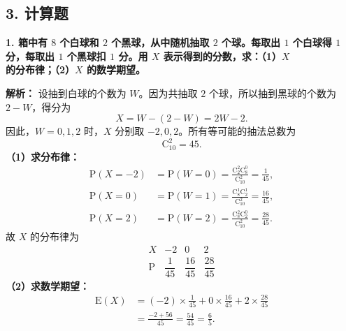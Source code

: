 ﻿\documentclass[UTF8,11pt,a4paper]{ctexart}
\newcommand{\Pp}{\mathrm{P}}
\newcommand{\E}{\mathrm{E}}
\newcommand{\Cnk}[2]{\mathrm{C}_{#1}^{#2}}
\newcommand{\Ana}[1]{\par\textbf{解析：}#1\par\medskip}
\newcommand{\Q}[1]{\par\textbf{#1}\par}
\begin{document}
\subsection*{3. 计算题}
\Q{1. 箱中有 $8$ 个白球和 $2$ 个黑球，从中随机抽取 $2$ 个球。每取出 $1$ 个白球得 $1$ 分，每取出 $1$ 个黑球扣 $1$ 分。用 $X$ 表示得到的分数，求：（1）$X$ 的分布律；（2）$X$ 的数学期望。}
\Ana{
设抽到白球的个数为 $W$。因为共抽取 $2$ 个球，所以抽到黑球的个数为 $2-W$，得分为
\[
X=W-(2-W)=2W-2.
\]
因此，$W=0,1,2$ 时，$X$ 分别取 $-2,0,2$。所有等可能的抽法总数为
\[
\Cnk{10}{2}=45.
\]
\textbf{（1）求分布律：}
\[
\begin{aligned}
\Pp(X=-2)
&=\Pp(W=0)
 =\frac{\Cnk{2}{2}\Cnk{8}{0}}{\Cnk{10}{2}}
 =\frac{1}{45},\\
\Pp(X=0)
&=\Pp(W=1)
 =\frac{\Cnk{8}{1}\Cnk{2}{1}}{\Cnk{10}{2}}
 =\frac{16}{45},\\
\Pp(X=2)
&=\Pp(W=2)
 =\frac{\Cnk{8}{2}\Cnk{2}{0}}{\Cnk{10}{2}}
 =\frac{28}{45}.
\end{aligned}
\]
故 $X$ 的分布律为
\[
\begin{array}{c|ccc}
X&-2&0&2\\\hline
\Pp&\dfrac1{45}&\dfrac{16}{45}&\dfrac{28}{45}
\end{array}
\]
\textbf{（2）求数学期望：}
\[
\begin{aligned}
\E(X)
&=(-2)\times\frac1{45}+0\times\frac{16}{45}+2\times\frac{28}{45}\\
&=\frac{-2+56}{45}=\frac{54}{45}=\frac65.
\end{aligned}
\]}
\end{document}

